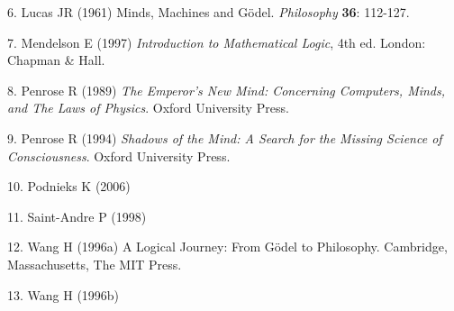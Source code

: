 \documentclass[12pt]{article}
\begin{document}
6. Lucas JR (1961) Minds, Machines and G\"odel. \emph{Philosophy}
\textbf{36}: 112-127.

7. Mendelson E (1997) \emph{Introduction to Mathematical
Logic}, 4th ed. London: Chapman \& Hall.

8. Penrose R (1989) \emph{The Emperor's New Mind: Concerning
Computers, Minds, and The Laws of Physics}. Oxford University Press.

9. Penrose R (1994) \emph{Shadows of the Mind: A Search
for the Missing Science of Consciousness}. Oxford University Press.

10. Podnieks K (2006) 

11. Saint-Andre P (1998) 

12. Wang H (1996a) A Logical Journey: From G\"odel to Philosophy. Cambridge, Massachusetts, The MIT Press.

13. Wang H (1996b) 

\end{document}
